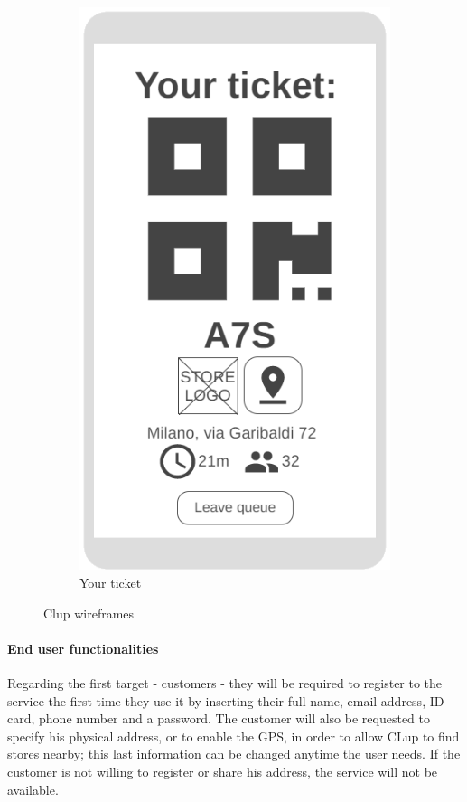 \begin{figure}[h!]
\begin{subfigure}[b]{0.3\textwidth}
		\includegraphics[width=\linewidth]{../Diagrams/WireframesCLup/Ticket.png}
		\caption{Your ticket}
		\label{fig:WfTicket}
	\end{subfigure}
	\caption{Clup wireframes}
	\label{fig:Wireframes}
\end{figure}
\paragraph{End user functionalities}
Regarding the first target - customers - they will be required to register to the service the first time they use it by inserting their full name, email address, ID card, phone number and a password. The customer will also be requested to specify his physical address, or to enable the GPS, in order to allow CLup to find stores nearby; this last information can be changed anytime the user needs. If the customer is not willing to register or share his address, the service will not be available.

